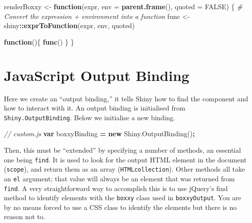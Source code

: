 \documentclass[10pt,]{krantz}
\makeatletter
\newenvironment{Shaded}{\begin{snugshade}}{\end{snugshade}}
\newcommand{\AttributeTok}[1]{\textcolor[rgb]{0.61,0.61,0.61}{#1}}
\newcommand{\CommentTok}[1]{\textcolor[rgb]{0.37,0.37,0.37}{\textit{#1}}}
\newcommand{\ControlFlowTok}[1]{\textcolor[rgb]{0.27,0.27,0.27}{\textbf{#1}}}
\newcommand{\DataTypeTok}[1]{\textcolor[rgb]{0.27,0.27,0.27}{#1}}
\newcommand{\KeywordTok}[1]{\textcolor[rgb]{0.27,0.27,0.27}{\textbf{#1}}}
\newcommand{\NormalTok}[1]{#1}
\newcommand{\OperatorTok}[1]{\textcolor[rgb]{0.43,0.43,0.43}{\textbf{#1}}}
\newcommand{\OtherTok}[1]{\textcolor[rgb]{0.37,0.37,0.37}{#1}}
\newcommand{\StringTok}[1]{\textcolor[rgb]{0.5,0.5,0.5}{#1}}
\newcommand{\VariableTok}[1]{\textcolor[rgb]{0,0,0}{#1}}
\newenvironment{kframe}{%
\medskip{}
\setlength{\fboxsep}{.8em}
 \def\at@end@of@kframe{}%
 \ifinner\ifhmode%
  \def\at@end@of@kframe{\end{minipage}}%
  \begin{minipage}{\columnwidth}%
 \fi\fi%
 \def\FrameCommand##1{\hskip\@totalleftmargin \hskip-\fboxsep
 \colorbox{shadecolor}{##1}\hskip-\fboxsep
     \hskip-\linewidth \hskip-\@totalleftmargin \hskip\columnwidth}%
 \MakeFramed {\advance\hsize-\width
   \@totalleftmargin\z@ \linewidth\hsize
   \@setminipage}}%
 {\par\unskip\endMakeFramed%
 \at@end@of@kframe}
\renewenvironment{Shaded}{\begin{kframe}}{\end{kframe}}
\makeatother
\begin{document}
\begin{Shaded}
\begin{Highlighting}[]
\NormalTok{renderBoxxy <-}\StringTok{ }\ControlFlowTok{function}\NormalTok{(expr, }\DataTypeTok{env =} \KeywordTok{parent.frame}\NormalTok{(), }
  \DataTypeTok{quoted =} \OtherTok{FALSE}\NormalTok{) \{}
  \CommentTok{# Convert the expression + environment into a function}
\NormalTok{  func <-}\StringTok{ }\NormalTok{shiny}\OperatorTok{::}\KeywordTok{exprToFunction}\NormalTok{(expr, env, quoted)}

  \ControlFlowTok{function}\NormalTok{()\{}
    \KeywordTok{func}\NormalTok{()}
\NormalTok{  \}}
\NormalTok{\}}
\end{Highlighting}
\end{Shaded}

\hypertarget{shiny-output-binding}{%
\section{JavaScript Output Binding}\label{shiny-output-binding}}

Here we create an ``output binding,'' it tells Shiny how to find the component and how to interact with it. An output binding is initialised from \texttt{Shiny.OutputBinding}. Below we initialise a new binding.

\begin{Shaded}
\begin{Highlighting}[]
\CommentTok{// custom.js}
\KeywordTok{var}\NormalTok{ boxxyBinding }\OperatorTok{=} \KeywordTok{new} \VariableTok{Shiny}\NormalTok{.}\AttributeTok{OutputBinding}\NormalTok{()}\OperatorTok{;}
\end{Highlighting}
\end{Shaded}

Then, this must be ``extended'' by specifying a number of methods, an essential one being \texttt{find}. It is used to look for the output HTML element in the document (\texttt{scope}), and return them as an array (\texttt{HTMLcollection}). Other methods all take an \texttt{el} argument; that value will always be an element that was returned from \texttt{find}. A very straightforward way to accomplish this is to use jQuery's find method to identify elements with the \texttt{boxxy} class used in \texttt{boxxyOutput}. You are by no means forced to use a CSS class to identify the elements but there is no reason not to.
\end{document}

